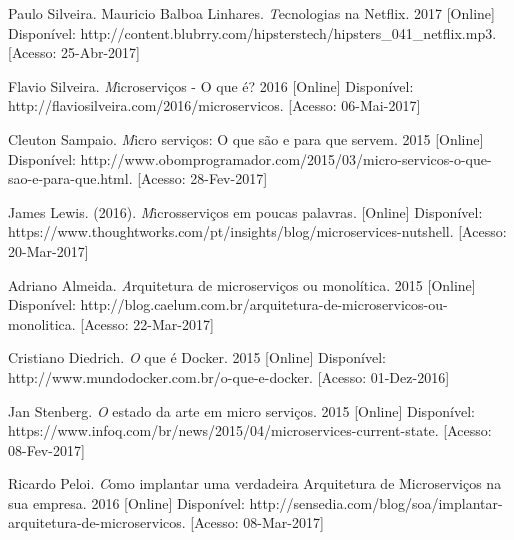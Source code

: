 \documentclass[journal]{IEEEtran}
\begin{document}
%
%
%
\begin{thebibliography}{1}

Paulo Silveira. Mauricio Balboa Linhares. \emph Tecnologias na Netflix. 2017 [Online] Disponível: http://content.blubrry.com/hipsterstech/hipsters\_041\_netflix.mp3. [Acesso: 25-Abr-2017]

Flavio Silveira. \emph Microserviços - O que é? 2016 [Online] Disponível:
http://flaviosilveira.com/2016/microservicos. [Acesso: 06-Mai-2017]

Cleuton Sampaio. \emph Micro serviços: O que são e para que servem. 2015 [Online] Disponível: http://www.obomprogramador.com/2015/03/micro-servicos-o-que-sao-e-para-que.html. [Acesso: 28-Fev-2017] 

James Lewis. (2016). \emph Microsserviços em poucas palavras. [Online] Disponível: https://www.thoughtworks.com/pt/insights/blog/microservices-nutshell. [Acesso: 20-Mar-2017]

Adriano Almeida. \emph Arquitetura de microserviços ou monolítica. 2015 [Online] Disponível: http://blog.caelum.com.br/arquitetura-de-microservicos-ou-monolitica. [Acesso: 22-Mar-2017]

Cristiano Diedrich. \emph O que é Docker. 2015 [Online] Disponível: http://www.mundodocker.com.br/o-que-e-docker. [Acesso: 01-Dez-2016]

Jan Stenberg. \emph O estado da arte em micro serviços. 2015 [Online] Disponível: https://www.infoq.com/br/news/2015/04/microservices-current-state. [Acesso: 08-Fev-2017]

Ricardo Peloi. \emph Como implantar uma verdadeira Arquitetura de Microserviços na sua empresa. 2016 [Online] Disponível: http://sensedia.com/blog/soa/implantar-arquitetura-de-microservicos. [Acesso: 08-Mar-2017]


\end{thebibliography}
\end{document}
